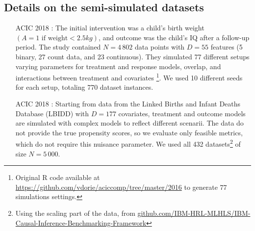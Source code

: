 \documentclass[unnumsec,webpdf,contemporary,large]{oup-authoring-template}%
\theoremstyle{thmstyleone}%
\theoremstyle{thmstyletwo}%
\theoremstyle{thmstylethree}%
\begin{document}
\begin{appendices}
    \subsection{ Details on the semi-simulated datasets}\label{apd:experiments:datasets}


    \begin{itemize}
        \item[ACIC 2018] \cite{dorie_automated_2019}:  The initial intervention was a child’s birth
            weight $(A = 1 \text{ if weight} < 2.5 kg)$, and outcome was the child’s
            IQ after a follow-up period. The study contained $N=4\,802$ data
            points with $D=55$ features (5 binary, 27 count data, and 23
            continuous). They simulated 77 different setups varying parameters
            for treatment and response models, overlap, and interactions between treatment and
            covariates \footnote{Original R code available at
                \url{https://github.com/vdorie/aciccomp/tree/master/2016}
                to generate 77 simulations settings.}. We used 10 different seeds
            for each setup, totaling 770 dataset instances.

        \item[ACIC 2018] \cite{shimoni_benchmarking_2018}: Starting from data from
            the Linked Births and Infant Deaths Database (LBIDD)
            \cite{macdorman_infant_1998} with $D=177$ covariates, treatment and
            outcome models are simulated with complex models to reflect different
            scenarii. The data do not provide the true propensity scores, so we
            evaluate only feasible metrics, which do not require this nuisance
            parameter. We used all 432 datasets\footnote{Using the scaling part of
                the data, from
                \href{https://github.com/IBM-HRL-MLHLS/IBM-Causal-Inference-Benchmarking-Framework}{github.com/IBM-HRL-MLHLS/IBM-Causal-Inference-Benchmarking-Framework}}
            of size $N=5\,000$.



\end{itemize}
\end{appendices}
\end{document}

